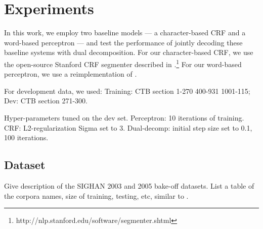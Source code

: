 \section{Experiments}

In this work, we employ two baseline models --- a character-based CRF and a word-based perceptron --- and test the performance of jointly decoding these baseline systems with dual decomposition. For our character-based CRF, we use the open-source Stanford CRF segmenter described in \cite{Tseng:2005:SIGHAN}.\footnote{http://nlp.stanford.edu/software/segmenter.shtml}
For our word-based perceptron, we use a reimplementation of \cite{Zhang:2007:ACL}.

For development data, we used:
Training: CTB section 1-270  400-931 1001-115;   Dev: CTB section 271-300.

Hyper-parameters tuned on the dev set.
Perceptron: 10 iterations of training. 
CRF: L2-regularization Sigma set to 3.
Dual-decomp: initial step size set to 0.1, 100 iterations. 

\subsection{Dataset}
Give description of the SIGHAN 2003 \cite{Sproat:2003:SIGHAN} and 2005 \cite{Emerson:2005:SIGHAN} bake-off datasets. 
List a table of the corpora names, size of training, testing, etc, similar to \cite{Sun:2010:COLING}.


